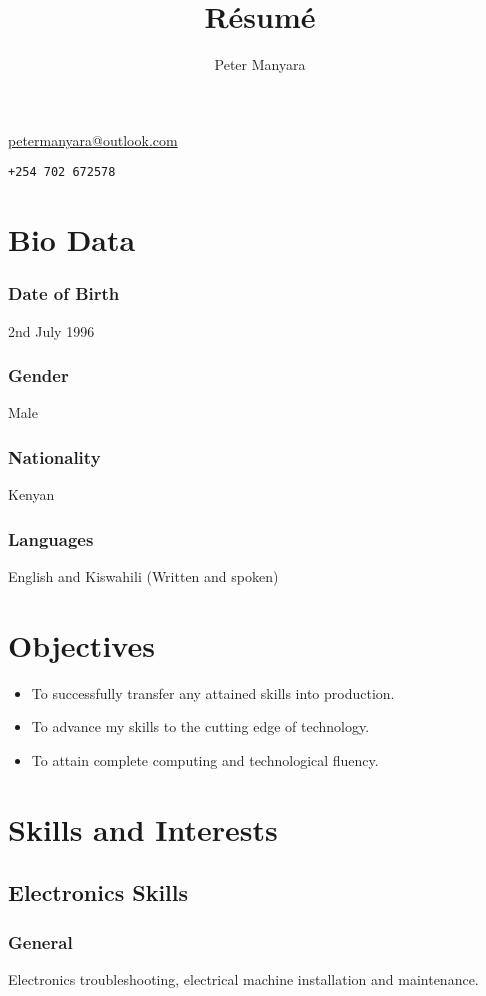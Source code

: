 \documentclass[a4paper,10pt]{article}
\title{R\'esum\'e}
\author{Peter Manyara}
\makeatletter
\renewcommand{\maketitle}
{
	\begin{center}
		{\Large\bfseries
		\theauthor}
	
		\vspace{.2cm}
		\Letter\hspace{.2cm}\href{mailto:petermanyara@outlook.com}{\ttfamily\color{blue!80!black!90}petermanyara@outlook.com}
		
		\phone\hspace{.2cm}\texttt{+254 702 672578}
	\end{center}
	
}
\makeatother
\begin{document}
\maketitle
\section{Bio Data}
\subsubsection{Date of Birth}
2nd July 1996
\subsubsection{Gender}
Male
\subsubsection{Nationality}
Kenyan
\subsubsection{Languages}
English and Kiswahili (Written and spoken)

\section{Objectives}
\begin{itemize}
	\item To successfully transfer any attained skills into production.
	\item To advance my skills to the cutting edge of technology.
	\item To attain complete computing and technological fluency.
\end{itemize}

\section{Skills and Interests}
\subsection{Electronics Skills}
\subsubsection{General}
Electronics troubleshooting, electrical machine installation and maintenance.
\end{document}
